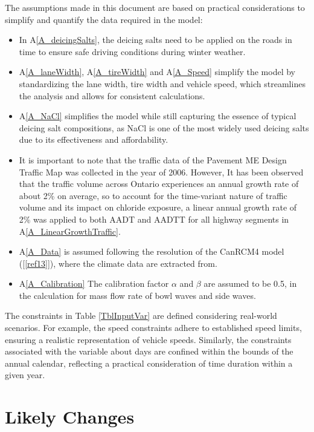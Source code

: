 \documentclass[12pt]{article}
\newcommand{\aref}[1]{A\ref{#1}}
\newcommand{\reref}[1]{\ref{#1}}
\begin{document}
The assumptions made in this document are based on practical considerations to simplify and quantify the data required in the model:
\begin{itemize} 
\item In \aref{A_deicingSalts}, the deicing salts need to be applied on the roads in time to ensure safe driving conditions during winter weather. 
\item \aref{A_laneWidth}, \aref{A_tireWidth} and \aref{A_Speed} simplify the model by standardizing the lane width, tire width and vehicle speed, which streamlines the analysis and allows for consistent calculations.
\item \aref{A_NaCl} simplifies the model while still capturing the essence of typical deicing salt compositions, as NaCl is one of the most widely used deicing salts due to its effectiveness and affordability.
\item It is important to note that the traffic data of the Pavement ME Design Traffic Map was collected in the year of 2006. However, It has been observed that the traffic volume across Ontario experiences an annual growth rate of about 2\% on average, so to account for the time-variant nature of traffic volume and its impact on chloride exposure, a linear annual growth rate of 2\% was applied to both AADT and AADTT for all highway segments in \aref{A_LinearGrowthTraffic}. 
\item \aref{A_Data} is assumed following the resolution of the CanRCM4 model ([\reref{ref13}]), where the climate data are extracted from.
\item \aref{A_Calibration} The calibration factor $\alpha$ and $\beta$ are assumed to be 0.5, in the calculation for mass flow rate of bowl waves and side waves.

\end{itemize}

The constraints in Table \ref{TblInputVar} are defined considering real-world scenarios. For example,  the speed constraints adhere to established speed limits, ensuring a realistic representation of vehicle speeds. Similarly, the constraints associated with the variable about days are confined within the bounds of the annual calendar, reflecting a practical consideration of time duration within a given year.


\section{Likely Changes}    
\end{document}
